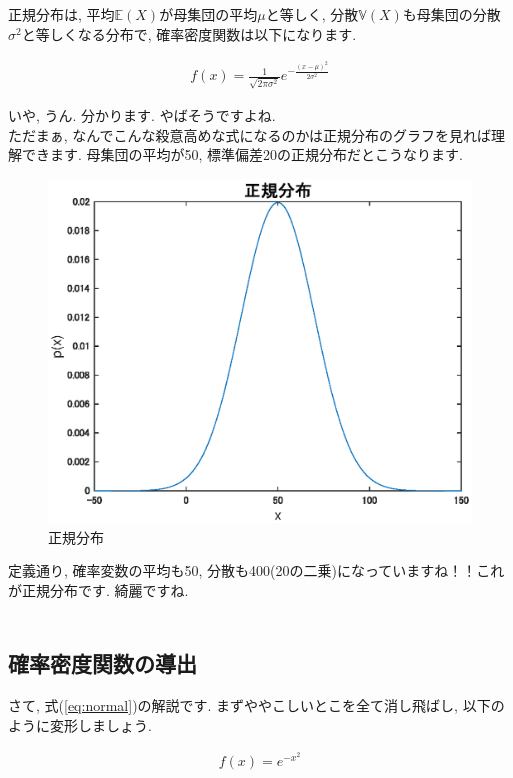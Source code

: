 \documentclass[11pt,a4paper,uplatex]{ujreport} 	%
\begin{document}
正規分布は, 平均$\mathbb{E}(X)$が母集団の平均$μ$と等しく, 分散$\mathbb{V}(X)$も母集団の分散$\sigma ^2$と等しくなる分布で, 確率密度関数は以下になります.

\begin{align}
\label{eq:normal}
f(x) = \frac{1}{\sqrt{2\pi\sigma^2}}e^{-\frac{(x-\mu)^2}{2\sigma^2}}
\end{align}

いや, うん. 分かります. やばそうですよね. \\

ただまぁ, なんでこんな殺意高めな式になるのかは正規分布のグラフを見れば理解できます. 母集団の平均が50, 標準偏差20の正規分布だとこうなります.

\begin{figure}[H]
\label{im:normal}
  \centering
  \includegraphics[width=120mm]{../figures/normal.eps}
  \caption{正規分布}
\end{figure}

定義通り, 確率変数の平均も50, 分散も400(20の二乗)になっていますね！！これが正規分布です. 綺麗ですね.\\
\\
\subsection{確率密度関数の導出}
さて, 式(\ref{eq:normal})の解説です. まずややこしいとこを全て消し飛ばし, 以下のように変形しましょう. 

\begin{align}
\label{eq:normal2}
f(x) = e^{-x^2}
\end{align}
\end{document}
